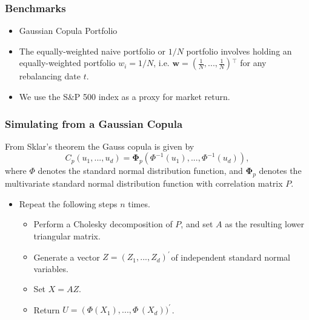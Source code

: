 \documentclass[pdf,9pt,xcolor=dvipsnames,hide notes]{beamer}
\begin{document}
\begin{frame}[label=frame7]
\frametitle{Benchmarks}

\begin{itemize}
\justifying
\item Gaussian Copula Portfolio

\vspace{0.3cm}

\item The equally-weighted naive portfolio or $1/N$ portfolio involves holding an equally-weighted portfolio $w_{i} = 1/N$, i.e. $\mathbf{w=}\left( \frac{1}{N},...,\frac{1}{N}\right) {^{\top }}$ for
any rebalancing date $t$.

\vspace{0.3cm}

\item We use the S\&P 500 index as a proxy for market return.


\end{itemize}

\end{frame}

\begin{frame}[label=frame7]
\frametitle{Simulating from a Gaussian Copula}

From Sklar's theorem the Gauss copula is given by \begin{equation}C_{p}\left (u_{1} , . . . ,u_{d}\right ) =\mathbf{\Phi }_{p}\left (\Phi ^{ -1}(u_{1}) , . . . ,\Phi ^{ -1}(u_{d})\right ) ,
\end{equation}where $\Phi $ denotes the standard normal distribution function, and $\mathbf{\Phi }_{p}$ denotes the multivariate standard normal distribution function with correlation matrix $P .$

\vspace{0.3cm}

\begin{itemize}
	\justifying
	\item Repeat the following steps $n$ times.
	
	\begin{itemize}
	\item Perform a Cholesky decomposition of $P$, and set $A$ as the resulting lower triangular matrix.
	
	\vspace{0.3cm}
	
	\item Generate a vector $Z =\left (Z_{1} , . . . ,Z_{d}\right )^{ \prime ^{\,}}$of independent standard normal variables.
	
	\vspace{0.3cm}
	
	\item Set $X =AZ$.
	
	\vspace{0.3cm}
	
	\item Return $U =\left (\Phi (X_{1})\right . , . . . ,\Phi ^{\,}(X_{d}))^{ \prime ^{\,}}$.
	\end{itemize}
	
	
\end{itemize}

\end{frame}
\end{document}

